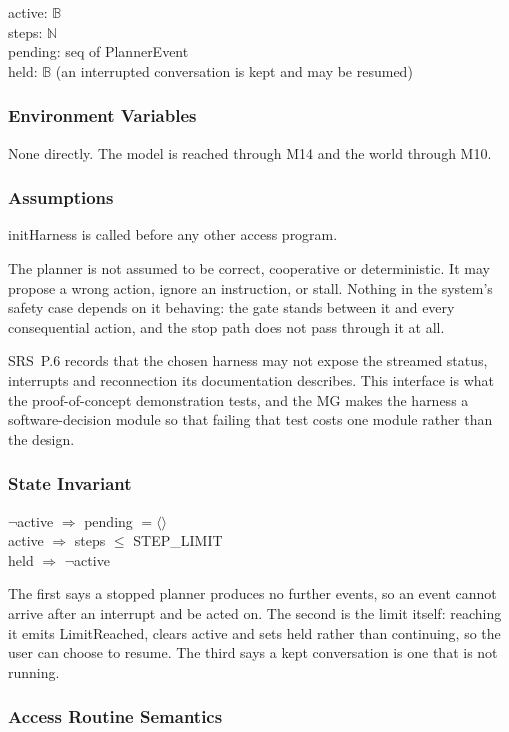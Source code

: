 \documentclass[12pt, titlepage]{article}
\newcommand{\B}{\mathbb{B}}
\newcommand{\N}{\mathbb{N}}
\begin{document}
\noindent active: $\B$\\
steps: $\N$\\
pending: seq of PlannerEvent\\
held: $\B$ (an interrupted conversation is kept and may be resumed)

\subsubsection{Environment Variables}

None directly. The model is reached through M14 and the world through M10.

\subsubsection{Assumptions}

initHarness is called before any other access program.

\noindent The planner is not assumed to be correct, cooperative or
deterministic. It may propose a wrong action, ignore an instruction, or stall.
Nothing in the system's safety case depends on it behaving: the gate stands
between it and every consequential action, and the stop path does not pass
through it at all.

\noindent SRS~P.6 records that the chosen harness may not expose the streamed
status, interrupts and reconnection its documentation describes. This interface
is what the proof-of-concept demonstration tests, and the MG makes the harness a
software-decision module so that failing that test costs one module rather than
the design.

\subsubsection{State Invariant}

\noindent $\lnot$active $\Rightarrow$ pending $= \langle\rangle$\\
active $\Rightarrow$ steps $\le$ STEP\_LIMIT\\
held $\Rightarrow$ $\lnot$active

\noindent The first says a stopped planner produces no further events, so an
event cannot arrive after an interrupt and be acted on. The second is the limit
itself: reaching it emits LimitReached, clears active and sets held rather than
continuing, so the user can choose to resume.
The third says a kept conversation is one that is not running.

\subsubsection{Access Routine Semantics}
\end{document}
